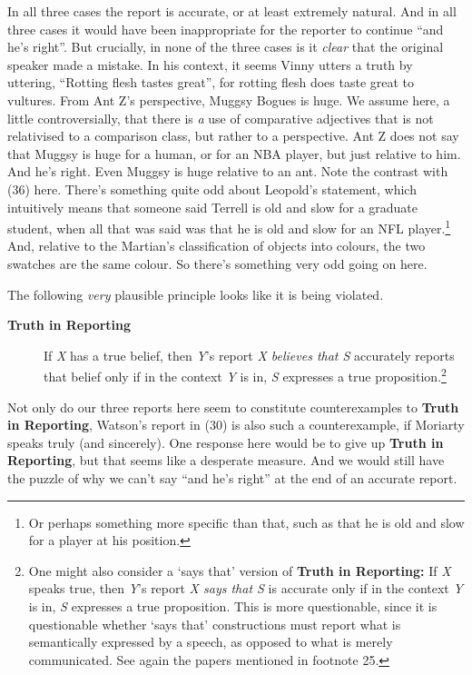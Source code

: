 \noindent In all three cases the report is accurate, or at least extremely natural. And in all three cases it would have been inappropriate for the reporter to continue ``and he's right''. But crucially, in none of the three cases is it \textit{clear} that the original speaker made a mistake. In his context, it seems Vinny utters a truth by uttering, ``Rotting flesh tastes great'', for rotting flesh does taste great to vultures. From Ant Z's perspective, Muggsy Bogues is huge. We assume here, a little controversially, that there is \textit{a} use of comparative adjectives that is not relativised to a comparison class, but rather to a perspective. Ant Z does not say that Muggsy is huge for a human, or for an NBA player, but just relative to him. And he's right. Even Muggsy is huge relative to an ant. Note the contrast with (36) here. There's something quite odd about Leopold's statement, which intuitively means that someone said Terrell is old and slow for a graduate student, when all that was said was that he is old and slow for an NFL player.\footnote{Or perhaps something more specific than that, such as that he is old and slow for a player at his position.} And, relative to the Martian's classification of objects into colours, the two swatches are the same colour. So there's something very odd going on here.
 
The following \textit{very} plausible principle looks like it is being violated.
 
\begin{description}
\item[\textbf{Truth in Reporting}] If \textit{X} has a true belief, then \textit{Y}'s report \textit{X believes that S} accurately reports that belief only if in the context \textit{Y} is in, \textit{S} expresses a true proposition.\footnote{One might also consider a `says that' version of \textbf{Truth in Reporting: }If \textit{X} speaks true, then \textit{Y}'s report \textit{X says that S} is accurate only if in the context \textit{Y} is in, \textit{S} expresses a true proposition. This is more questionable, since it is questionable whether `says that' constructions must report what is semantically expressed by a speech, as opposed to what is merely communicated. See again the papers mentioned in footnote 25.} 
\end{description} 
 
\noindent Not only do our three reports here seem to constitute counterexamples to \textbf{Truth in Reporting}, Watson's report in (30) is also such a counterexample, if Moriarty speaks truly (and sincerely). One response here would be to give up \textbf{Truth in Reporting}, but that seems like a desperate measure. And we would still have the puzzle of why we can't say ``and he's right'' at the end of an accurate report. 
 
